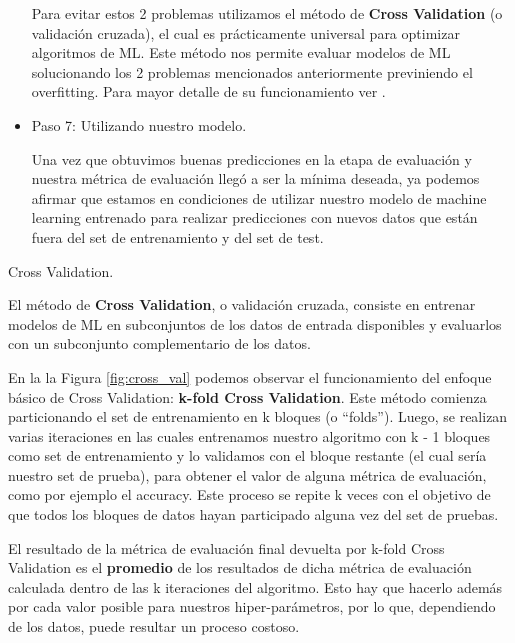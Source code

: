\documentclass[12pt,a4paper]{article}
\makeatletter
\renewcommand\paragraph{\@startsection{paragraph}{4}{\z@}
            {-2.5ex\@plus -1ex \@minus -.25ex}
            {1.25ex \@plus .25ex}
            {\normalfont\normalsize\bfseries}}
\makeatother
\begin{document}
\begin{sloppypar}
\begin{itemize}
Para evitar estos 2 problemas utilizamos el método de \textbf{Cross Validation} (o validación cruzada), el cual es prácticamente universal para optimizar algoritmos de ML. Este método nos permite evaluar modelos de ML solucionando los 2 problemas mencionados anteriormente previniendo el overfitting. Para mayor detalle de su funcionamiento ver \textit{}.\\

\item Paso 7: Utilizando nuestro modelo. 

Una vez que obtuvimos buenas predicciones en la etapa de evaluación y nuestra métrica de evaluación llegó a ser la mínima deseada, ya podemos afirmar que estamos en condiciones de utilizar nuestro modelo de machine learning entrenado para realizar predicciones con nuevos datos que están fuera del set de entrenamiento y del set de test.

\end{itemize}


\cleardoublepage
\paragraph{Cross Validation.}\label{Cross Validation}

El método de \textbf{Cross Validation}, o validación cruzada\cite{apunte_uba}\cite{cross_validation}, consiste en entrenar modelos de ML en subconjuntos de los datos de entrada disponibles y evaluarlos con un subconjunto complementario de los datos.

En la la Figura \ref{fig:cross_val} podemos observar el funcionamiento del enfoque básico de Cross Validation: \textbf{k-fold Cross Validation}. Este método comienza particionando el set de entrenamiento en k bloques (o ``folds''). Luego, se realizan varias iteraciones en las cuales entrenamos nuestro algoritmo con k - 1 bloques como set de entrenamiento y lo validamos con el bloque restante (el cual sería nuestro set de prueba), para obtener el valor de alguna métrica de evaluación, como por ejemplo el accuracy. Este proceso se repite k veces con el objetivo de que todos los bloques de datos hayan participado alguna vez del set de pruebas. 

El resultado de la métrica de evaluación final devuelta por k-fold Cross Validation es el \textbf{promedio} de los resultados de dicha métrica de evaluación calculada dentro de las k iteraciones del algoritmo. Esto hay que hacerlo además por cada valor posible para nuestros hiper-parámetros, por lo que, dependiendo de los datos, puede resultar un proceso costoso.


\end{sloppypar}
\end{document}
